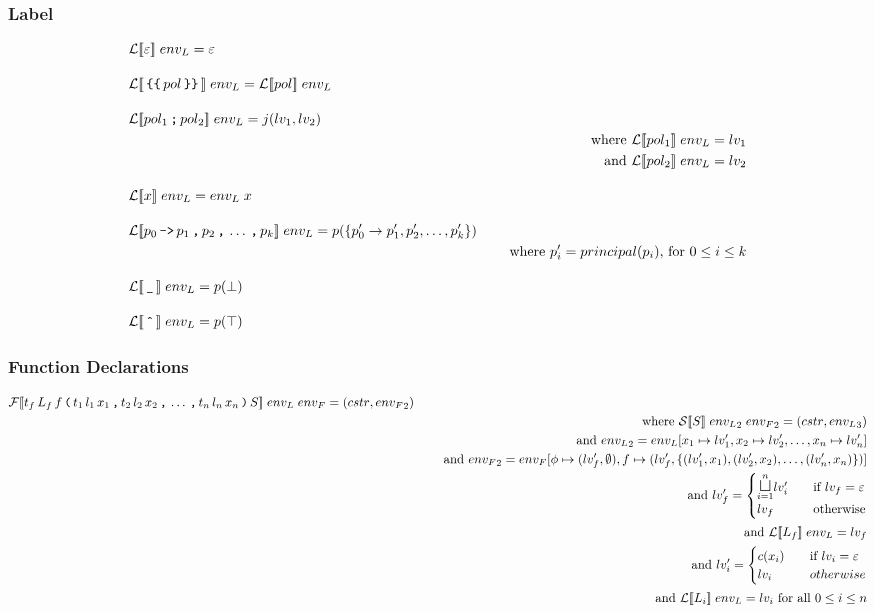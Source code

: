 \subsubsection{Label}
\begin{align*}
& \iL\dblSq{\varepsilon} \; \ienvL = \varepsilon \seSpace
%
& \iL\dblSq{\tk{\{\{} pol \tk{\}\}}} \; \ienvL = \iL\dblSq{pol} \; \ienvL \seSpace
%
& \iL\dblSq{pol_1 \tk ; pol_2} \; \ienvL = j(\ilv_1, \ilv_2) \\
& \seWhere{\iL\dblSq{pol_1} \; \ienvL = \ilv_1} \\
& \seAnd{\iL\dblSq{pol_2} \; \ienvL = \ilv_2} \seSpace
%
& \iL\dblSq{x} \; \ienvL = \ienvL \; x \seSpace
%
& \iL\dblSq{p_0 \tk{->} p_1 \tk , p_2 \tk, \dots \tk , p_k} \; \ienvL = p(\{p_0' \rightarrow p_1', p_2', \dots, p_k'\}) \\
& \seWhere{p_i' = principal(p_i) \text{, for } 0 \leq i \leq k} \seSpace
%
& \iL\dblSq{\tk \_} \; \ienvL = p(\bot) \seSpace
& \iL\dblSq{\tk{\^{}}} \; \ienvL = p(\top)
\end{align*}

\subsubsection{Function Declarations}
\begin{align*}
& \iF\dblSq{t_f \, L_f \, f \tk ( t_1 \, l_1 \, x_1 \tk , t_2 \, l_2 \, x_2 \tk , \dots \tk , t_n \, l_n \, x_n \tk ) S} \; \ienvL \; \ienvF
  =  (\icstr, \ienvF_2) \\
& \seWhere{\iS\dblSq{S} \; \ienvL_2 \; \ienvF_2 = (\icstr, \ienvL_3)} \\
& \seAnd{\ienvL_2 = \ienvL[x_1 \mapsto \ilv_1', x_2 \mapsto \ilv_2', \dots, x_n \mapsto \ilv_n']} \\
& \seAnd{\ienvF_2 = \ienvF[\ifb \mapsto (\ilv_f', \emptyset), f \mapsto (\ilv_f', \{(\ilv_1', x_1), (\ilv_2', x_2), \dots, (\ilv_n', x_n)\})]} \\
& \seAnd{\ilv_f' = \begin{cases}
    \mathlarger\sqcupl_{i = 1}^n \ilv_i' & \quad \text{if } \ilv_f = \varepsilon \\
    \ilv_f & \quad \text{otherwise}
  \end{cases}} \\
& \seAnd{\iL\dblSq{L_f} \; \ienvL = \ilv_f} \\
& \seAnd{\ilv_i' = \begin{cases}
    c(x_i) & \quad \text{if } \ilv_i = \varepsilon \\
    \ilv_i & \quad otherwise
  \end{cases}} \\
& \seAnd{\iL\dblSq{L_i} \; \ienvL = \ilv_i \text{ for all } 0 \leq i \leq n}
\end{align*}

